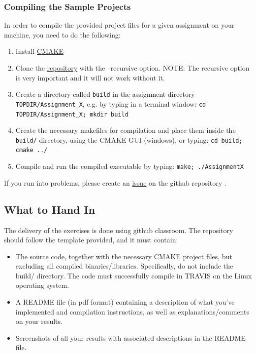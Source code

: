 \documentclass[11pt]{report}
\begin{document}
\subsubsection*{Compiling the Sample Projects}
In order to compile the provided project files for a given assignment on your machine, you need to do the following:
  \begin{enumerate}
\item{Install \href{http://www.cmake.org/download/}{CMAKE}}
\item{Clone the \href{https://github.com/danielepanozzo/cg}{repository} with the --recursive option. NOTE: The recursive option is very important and it will not work without it. }
\item{Create a directory called \texttt{build} in the assignment directory \texttt{TOPDIR/Assignment\_X}, e.g. by typing in a terminal window:
\texttt{cd TOPDIR/Assignment\_X; mkdir build}
}
\item{
Create the necessary makefiles for compilation and place them inside the \texttt{build/} directory, using the CMAKE GUI (windows), or typing:
\texttt{cd build; cmake ../}
}
\item{Compile and run the compiled executable by typing:
\texttt{make; ./AssignmentX}
}
\end{enumerate}

If you run into problems, please create an \href{https://github.com/jccosta/CS-GY-6533/issues}{issue} on the github repository .

\subsection*{What to Hand In}
The delivery of the exercises is done using github classroom. The repository should follow the template provided, and it must contain:
\begin{itemize}
\item{The source code, together with the necessary CMAKE project files, but excluding all compiled binaries/libraries. Specifically, do not include the build/ directory. The code must successfully compile in TRAVIS on the Linux operating system.}
\item{A README file (in pdf format) containing a description of what you've implemented and compilation
instructions, as well as explanations/comments on your results.}
\item{Screenshots of all your results with associated descriptions in the README file.}
\end{itemize}
\end{document}
